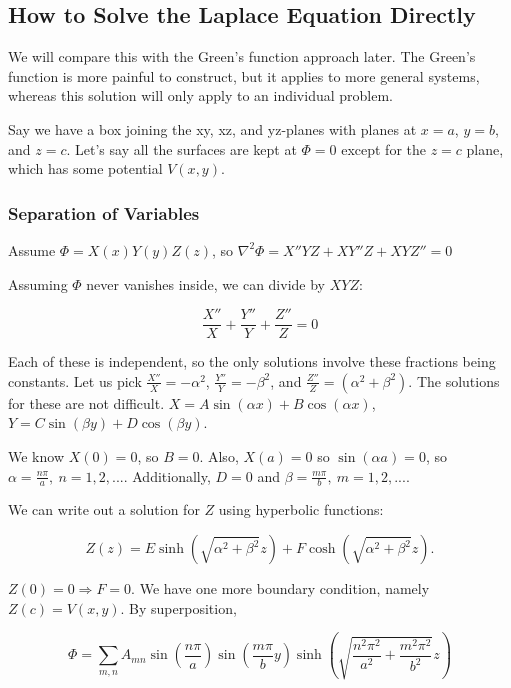 \documentclass[a4paper,twoside,master.tex]{subfiles}
\begin{document}
\subsection{How to Solve the Laplace Equation Directly}%
\label{sub:how_to_solve_the_laplace_equation_directly}

We will compare this with the Green's function approach later. The Green's function is more painful to construct, but it applies to more general systems, whereas this solution will only apply to an individual problem.

Say we have a box joining the xy, xz, and yz-planes with planes at $x=a$, $y=b$, and $z=c$. Let's say all the surfaces are kept at $\Phi = 0$ except for the $z=c$ plane, which has some potential $V(x,y)$.

\subsubsection{Separation of Variables}%
\label{subsub:separation_of_variables}

Assume $\Phi = X(x)Y(y)Z(z)$, so $\nabla^2\Phi = X''YZ+XY''Z+XYZ''=0$

Assuming $\Phi$ never vanishes inside, we can divide by $XYZ$:

\begin{equation}
   \frac{X''}{X}+\frac{Y''}{Y}+\frac{Z''}{Z}=0
\end{equation}

Each of these is independent, so the only solutions involve these fractions being constants. Let us pick $\frac{X''}{X} = -\alpha^2$, $\frac{Y''}{Y}=-\beta^2$, and $\frac{Z''}{Z}=(\alpha^2+\beta^2)$. The solutions for these are not difficult. $X = A\sin(\alpha x) + B\cos(\alpha x)$, $Y=C\sin(\beta y) + D\cos(\beta y)$.

We know $X(0) = 0$, so $B=0$. Also, $X(a) = 0$ so $\sin(\alpha a) = 0$, so $\alpha = \frac{n\pi}{a},\ n=1,2,...$. Additionally, $D=0$ and $\beta = \frac{m\pi}{b},\ m=1,2,...$.

We can write out a solution for $Z$ using hyperbolic functions:

\begin{equation}
   Z(z) = E\sinh (\sqrt{\alpha^2+\beta^2}z) + F\cosh(\sqrt{\alpha^2+\beta^2}z).
\end{equation}

$Z(0)=0\Rightarrow F=0$. We have one more boundary condition, namely $Z(c) = V(x,y)$. By superposition,

\begin{equation}
   \Phi = \sum_{m,n}A_{mn}\sin(\frac{n\pi}{a})\sin(\frac{m\pi}{b}y)\sinh(\sqrt{\frac{n^2\pi^2}{a^2}+\frac{m^2\pi^2}{b^2}}z)
\end{equation}
\end{document}
